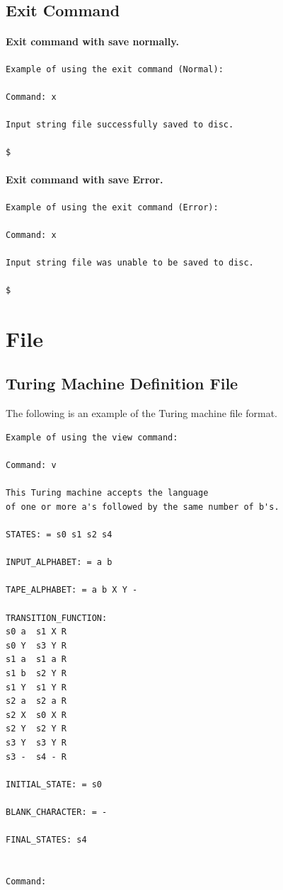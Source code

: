 \documentclass{report}
\begin{document}
\pagebreak
     \section{Exit Command}
     
\subsubsection{Exit command with save normally.}
     \begin{verbatim}
Example of using the exit command (Normal):

Command: x

Input string file successfully saved to disc.

$ 
\end{verbatim}

\subsubsection{Exit command with save Error.}
     \begin{verbatim}
Example of using the exit command (Error):

Command: x

Input string file was unable to be saved to disc.

$ 
\end{verbatim}
     
    

\chapter{File} 	
    
\section{Turing Machine Definition File} 
The following is an example of the Turing machine file format.

\begin{verbatim}
Example of using the view command:

Command: v

This Turing machine accepts the language 
of one or more a's followed by the same number of b's.

STATES: = s0 s1 s2 s4
	
INPUT_ALPHABET: = a b

TAPE_ALPHABET: = a b X Y -

TRANSITION_FUNCTION:
s0 a  s1 X R
s0 Y  s3 Y R
s1 a  s1 a R
s1 b  s2 Y R
s1 Y  s1 Y R
s2 a  s2 a R
s2 X  s0 X R
s2 Y  s2 Y R
s3 Y  s3 Y R
s3 -  s4 - R

INITIAL_STATE: = s0

BLANK_CHARACTER: = -

FINAL_STATES: s4


Command: 
\end{verbatim}
\end{document}

